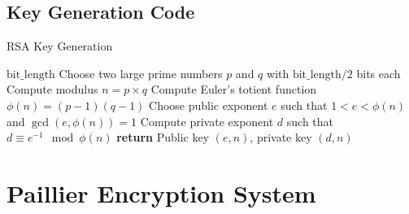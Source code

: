 \documentclass{article}
\begin{document}
\subsection{Key Generation Code}
\begin{algorithm}
\caption{RSA Key Generation}
\begin{algorithmic}[1]
 {$\text{bit\_length}$}
    \State Choose two large prime numbers $p$ and $q$ with $\text{bit\_length}/2$ bits each
    \State Compute modulus $n = p \times q$
    \State Compute Euler's totient function $\phi(n) = (p-1)(q-1)$
    \State Choose public exponent $e$ such that $1 < e < \phi(n)$ and $\gcd(e, \phi(n)) = 1$
    \State Compute private exponent $d$ such that $d \equiv e^{-1} \mod \phi(n)$
    \State \textbf{return} Public key $(e, n)$, private key $(d, n)$
\EndProcedure
\end{algorithmic}
\end{algorithm}

\newpage

\section{Paillier Encryption System}
\end{document}
